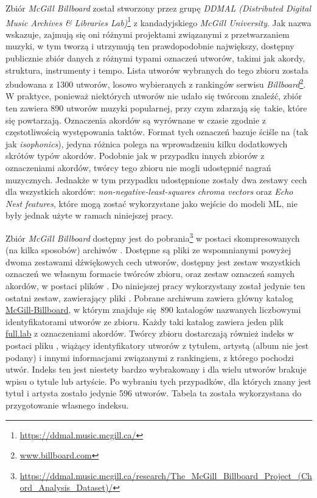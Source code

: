 Zbiór \emph{McGill Billboard} \cite{burgoyne_expert_2011} został stworzony przez grupę \emph{DDMAL
(Distributed Digital Music Archives \& Libraries Lab)}\footnote{\url{https://ddmal.music.mcgill.ca/}} z
kandadyjskiego \emph{McGill University}. Jak nazwa wskazuje, zajmują się oni różnymi projektami
związanymi z przetwarzaniem muzyki, w tym tworzą i utrzymują ten prawdopodobnie największy, dostępny
publicznie zbiór danych z różnymi typami oznaczeń utworów, takimi jak akordy, struktura, instrumenty
i tempo. Lista utworów wybranych do tego zbioru została zbudowana z 1300 utworów, losowo
wybieranych z rankingów serwisu \emph{Billboard}\footnote{\url{www.billboard.com}}. W praktyce, ponieważ
niektórych utworów nie udało się twórcom znaleźć, zbiór ten zawiera 890 utworów muzyki popularnej,
przy czym zdarzają się takie, które się powtarzają. Oznaczenia akordów są wyrównane w czasie zgodnie
z częstotliwością występowania taktów. Format tych oznaczeń bazuje ściśle na
\cite{harte_towards_nodate} (tak jak \emph{isophonics}), jedyna różnica polega na wprowadzeniu kilku
dodatkowych skrótów typów akordów.  Podobnie jak w przypadku innych zbiorów z oznaczeniami akordów,
twórcy tego zbioru nie mogli udostępnić nagrań muzycznych. Jednakże w tym przypadku udostępnione
zostały dwa zestawy cech dla wszystkich akordów: \emph{non-negative-least-squares chroma vectors}
oraz \emph{Echo Nest features}, które mogą zostać wykorzystane jako wejście do modeli ML, nie były
jednak użyte w ramach niniejszej pracy.

Zbiór \emph{McGill Billboard} dostępny jest do
pobrania\footnote{\url{https://ddmal.music.mcgill.ca/research/The_McGill_Billboard_Project_(Chord_Analysis_Dataset)/}}
w postaci skompresowanych (na kilka sposobów) archiwów . Dostępne są pliki ze wspomnianymi
powyżej dwoma zestawami dźwiękowych cech utworów, dostępny jest zestaw wszystkich oznaczeń we
własnym formacie twórców zbioru, oraz zestaw oznaczeń samych akordów, w postaci plików .
Do niniejszej pracy wykorzystany został jedynie ten ostatni zestaw, zawierający pliki . Pobrane
archiwum zawiera główny katalog \url{McGill-Billboard}, w którym znajduje się 890 katalogów nazwanych
liczbowymi identyfikatorami utworów ze zbioru. Każdy taki katalog zawiera jeden plik \url{full.lab} z
oznaczeniami akordów. Twórcy zbioru dostarczają również indeks w postaci pliku , wiążący
identyfikatory utworów z tytułem, artystą (album nie jest podany) i innymi informacjami związanymi z
rankingiem, z którego pochodzi utwór. Indeks ten jest niestety bardzo wybrakowany i dla wielu
utworów brakuje wpisu o tytule lub artyście. Po wybraniu tych przypadków, dla których znany jest
tytuł i artysta zostało jedynie 596 utworów. Tabela ta została wykorzystana do przygotowanie
własnego indeksu.

